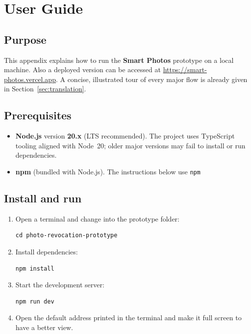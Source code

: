 \chapter{User Guide}
\label{app:user-guide}

\section{Purpose}
\label{sec:user-guide-purpose}

\noindent
 This appendix explains how to run the \textbf{Smart Photos} prototype on a local machine. Also a deployed version can be accessed at \url{https://smart-photos.vercel.app}.
A concise, illustrated tour of every major flow is already given in Section~\ref{sec:translation}. 

\section{Prerequisites}

\begin{itemize}
  \item \textbf{Node.js} version \textbf{20.x} (LTS recommended). The project uses TypeScript tooling aligned with Node~20; older major versions may fail to install or run dependencies.
  \item \textbf{npm} (bundled with Node.js). The instructions below use \texttt{npm}
\end{itemize}

\section{Install and run}

\begin{enumerate}
  \item Open a terminal and change into the prototype folder:
  \begin{verbatim}
cd photo-revocation-prototype
  \end{verbatim}
  \item Install dependencies:
  \begin{verbatim}
npm install
  \end{verbatim}
  \item Start the development server:
  \begin{verbatim}
npm run dev
  \end{verbatim}
  \item Open the default address printed in the terminal and make it full screen to have a better view. 
\end{enumerate}

